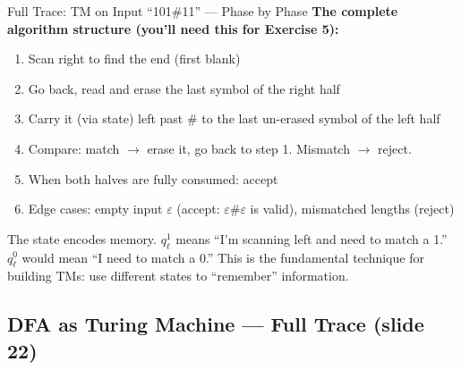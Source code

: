 \documentclass[11pt,a4paper]{article}
\newcommand{\kt}[1]{\par\vspace{0.3em}\colorbox{yellow!60}{\parbox{\dimexpr\linewidth-2\fboxsep}{#1}}\vspace{0.3em}}
\begin{document}
\begin{examplebox}{Full Trace: TM on Input ``101\#11'' --- Phase by Phase}
\textbf{The complete algorithm structure (you'll need this for Exercise 5):}
\begin{enumerate}[nosep]
\item Scan right to find the end (first blank)
\item Go back, read and erase the last symbol of the right half
\item Carry it (via state) left past \# to the last un-erased symbol of the left half
\item Compare: match $\to$ erase it, go back to step 1. Mismatch $\to$ reject.
\item When both halves are fully consumed: accept
\item Edge cases: empty input $\varepsilon$ (accept: $\varepsilon\#\varepsilon$ is valid), mismatched lengths (reject)
\end{enumerate}

\kt{The state encodes memory. $q_\ell^1$ means ``I'm scanning left and need to match a 1.'' $q_\ell^0$ would mean ``I need to match a 0.'' This is the fundamental technique for building TMs: use different states to ``remember'' information.}
\end{examplebox}

\subsection{DFA as Turing Machine --- Full Trace (slide 22)}
\end{document}
